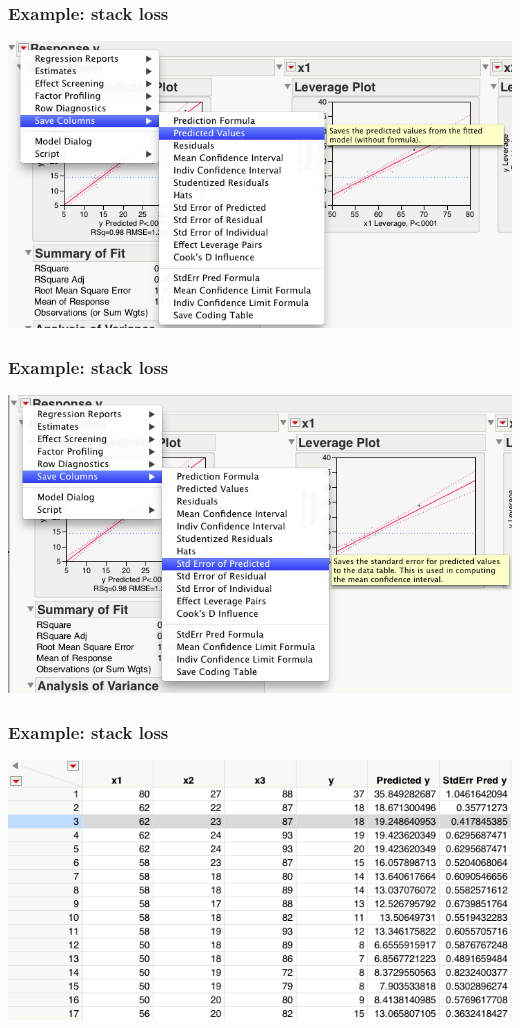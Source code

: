 \documentclass[handout]{beamer}\usepackage{graphicx, color}
\numberwithin{equation}{section}
\begin{document}
\begin{frame}
\frametitle{Example: stack loss}
 \includegraphics{../../fig/mmc1.png}
\end{frame}

\begin{frame}
\frametitle{Example: stack loss}
 \includegraphics{../../fig/mmc2.png}
\end{frame}

\begin{frame}
\frametitle{Example: stack loss}
 \includegraphics{../../fig/mmc3.png}
\end{frame}
\end{document}
